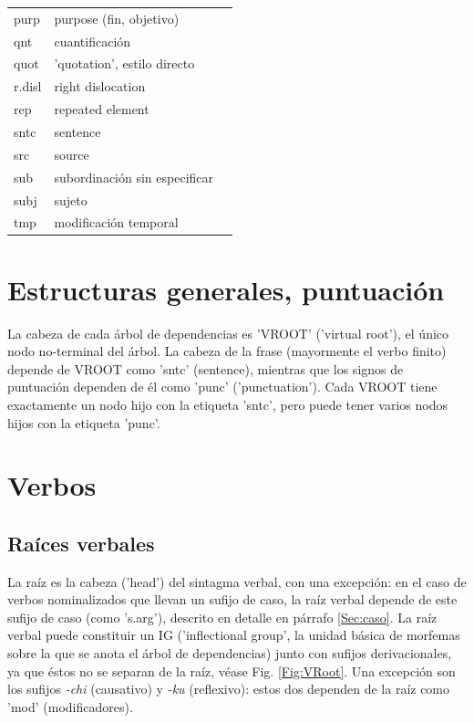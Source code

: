 \documentclass[a4paper,11pt,DIV12]{scrartcl}
\begin{document}
\begin{table}
\begin{center}
\begin{tabular}{lll}
purp & purpose (fin, objetivo)\\
qnt & cuantificaci\'on \\
quot & 'quotation', estilo directo\\
r.disl & right dislocation \\
rep & repeated element\\
sntc & sentence\\
src & source\\
sub & subordinaci\'on sin especificar\\
subj & sujeto\\
tmp & modificaci\'on temporal\\
\bottomrule
\end{tabular}
\end{center}
\end{table}

\clearpage
\section{Estructuras generales, puntuaci\'on}

La cabeza de cada \'arbol de dependencias es 'VROOT' ('virtual root'), el \'unico nodo no-terminal del \'arbol. La cabeza de la frase (mayormente el verbo finito) depende de VROOT como 'sntc' (sentence), mientras que los signos de puntuaci\'on dependen de \'el como 'punc' ('punctuation'). Cada VROOT tiene exactamente un nodo hijo con la etiqueta 'sntc', pero puede tener varios nodos hijos con la etiqueta 'punc'.



\section{Verbos}
  \subsection{Ra\'ices verbales}\label{Sec:verbRoot}
  La ra\'iz es la cabeza ('head') del sintagma verbal, con una excepci\'on: en el caso de verbos nominalizados que llevan un sufijo de caso, la ra\'iz verbal depende de este sufijo de caso (como 's.arg'), descrito en detalle en p\'arrafo \ref{Sec:caso}.
 La ra\'iz verbal puede constituir un IG ('inflectional group', la unidad b\'asica de morfemas sobre la que se anota el \'arbol de dependencias) junto con sufijos derivacionales, ya que \'estos no se separan de la ra\'iz, v\'ease Fig. \ref{Fig:VRoot}. Una excepci\'on son los sufijos {\em -chi} (causativo) y {\em -ku} (reflexivo): estos dos dependen de la ra\'iz como 'mod' (modificadores).
\end{document}
